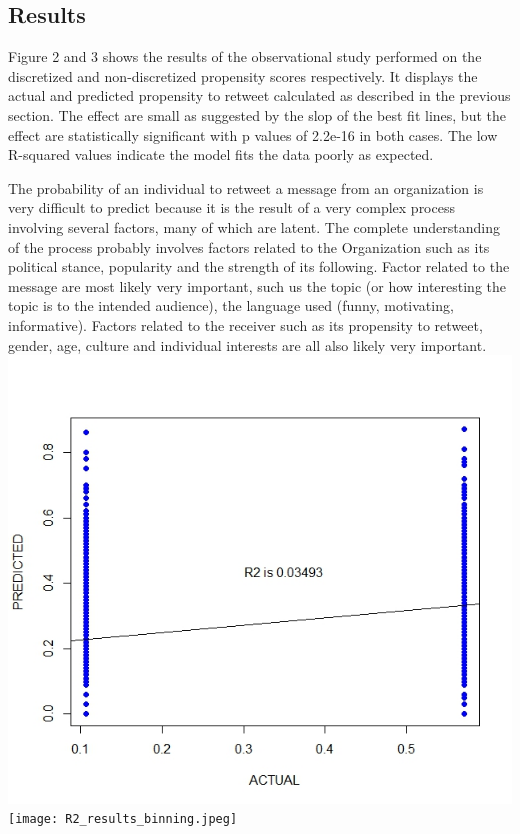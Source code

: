 \subsection{Results}
Figure 2 and 3 shows the results of the observational study performed on the discretized and non-discretized propensity scores respectively. It displays the actual and predicted propensity to retweet calculated as described in the previous section.   The effect are small as suggested by the slop of the best fit lines, but the effect are statistically significant with p values of 2.2e-16 in both cases.  The low R-squared values indicate the model fits the data poorly as expected.  

The probability of an individual to retweet a message from an organization is very difficult to predict because it is the result of a very complex process involving several factors, many of which are latent.  The complete understanding of the process probably involves factors related to the Organization such as its political stance, popularity and the strength of its following.  Factor related to the message are most likely very important, such us the topic (or how interesting the topic is to the intended audience), the language used (funny, motivating, informative).  Factors related to the receiver such as its propensity to retweet, gender, age, culture and individual interests are all also likely very important.  
\includegraphics[100,100]{PredictedvActual_binning.jpeg}
\texttt{[image: R2\_results\_binning.jpeg]}
